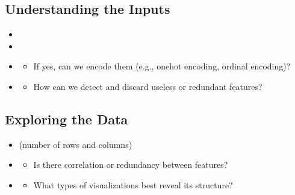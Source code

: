 \documentclass[letterpaper,10pt,english]{jupyterBook}
\begin{document}
\subsection{Understanding the Inputs}
\label{\detokenize{conclusion:understanding-the-inputs}}\begin{itemize}
\item {} 
\sphinxAtStartPar
{}

\item {} 
\sphinxAtStartPar
{}

\item {} 
\sphinxAtStartPar
{}
\begin{itemize}
\item {} 
\sphinxAtStartPar
If yes, can we encode them (e.g., one\sphinxhyphen{}hot encoding, ordinal encoding)?

\end{itemize}

\item {} 
\sphinxAtStartPar
{}
\begin{itemize}
\item {} 
\sphinxAtStartPar
How can we detect and discard useless or redundant features?

\end{itemize}

\end{itemize}


\subsection{Exploring the Data}
\label{\detokenize{conclusion:exploring-the-data}}\begin{itemize}
\item {} 
\sphinxAtStartPar
{} (number of rows and columns)

\item {} 
\sphinxAtStartPar
{}
\begin{itemize}
\item {} 
\sphinxAtStartPar
Is there correlation or redundancy between features?

\end{itemize}

\item {} 
\sphinxAtStartPar
{}
\begin{itemize}
\item {} 
\sphinxAtStartPar
What types of visualizations best reveal its structure?

\end{itemize}

\end{itemize}
\end{document}
